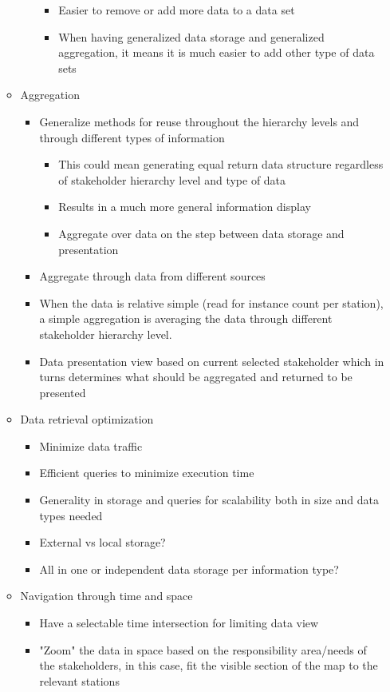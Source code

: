 \begin{itemize}
\begin{itemize}
\begin{itemize}
\begin{itemize}
				\item Easier to remove or add more data to a data set
				\item When having generalized data storage and generalized 
				aggregation, it means it is much easier to add other type of data sets
			\end{itemize}
		\end{itemize}
		\item Aggregation
		\begin{itemize}
			\item Generalize methods for reuse throughout the hierarchy levels and
			through different types of information
			\begin{itemize}
				\item This could mean generating equal return data structure regardless of
				stakeholder hierarchy level and type of data
				\item Results in a much more general information display
				\item Aggregate over data on the step between data storage and presentation
			\end{itemize}
			\item Aggregate through data from different sources
			\item When the data is relative simple (read for instance count per station), a simple aggregation is averaging the data through different stakeholder hierarchy
			level.
			\item Data presentation view based on current selected stakeholder 
			which in turns determines what should be aggregated and returned to be
			presented
		\end{itemize}
		\item Data retrieval optimization
		\begin{itemize}
			\item Minimize data traffic
			\item Efficient queries to minimize execution time
			\item Generality in storage and queries for scalability both  
			in size and data types needed
			\item External vs local storage?
			\item All in one or independent data storage per information 
			type?
		\end{itemize}
		\item Navigation through time and space
		\begin{itemize}
			\item Have a selectable time intersection for limiting data view
			\item "Zoom" the data in space based on the responsibility area/needs of the stakeholders, in this case, fit the visible section of the map to the relevant stations
		\end{itemize}
	\end{itemize}
\end{itemize}

